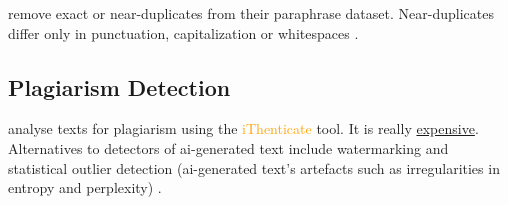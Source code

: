 \citet{gohsen_captions_2023} remove exact or near-duplicates from their paraphrase dataset.
Near-duplicates differ only in punctuation, capitalization or whitespaces \citep{gohsen_captions_2023}.

\subsection{Plagiarism Detection}
\citet{hassanipour_ability_2024} analyse texts for plagiarism using the \textcolor{orange}{iThenticate} tool.
It is really \href{https://www.ithenticate.com/pricing}{expensive}.
Alternatives to detectors of \ac{ai}-generated text include watermarking and statistical outlier detection 
(\ac{ai}-generated text's artefacts such as irregularities in entropy and perplexity) \citep{krishna_paraphrasing_2023}.